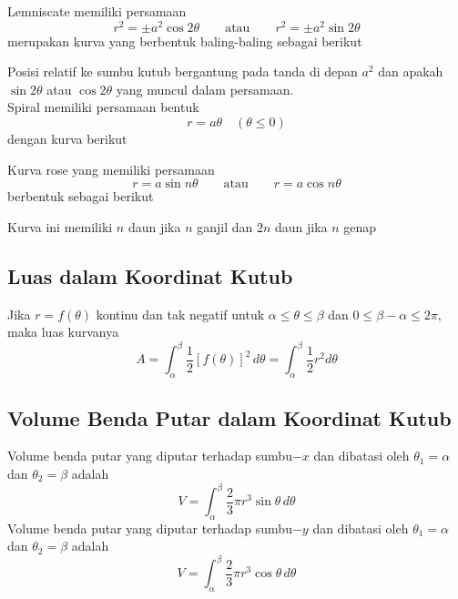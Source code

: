 \documentclass{article}
\begin{document}
Lemniscate memiliki persamaan 
$$ r^2=\pm a^2\cos 2\theta \qquad \text{atau}\qquad r^2=\pm a^2\sin 2\theta $$
merupakan kurva yang berbentuk baling-baling sebagai berikut 
\begin{center}
	\end{center}
Posisi relatif ke sumbu kutub bergantung pada tanda di depan $a^2$ dan apakah $\sin 2\theta$ atau $\cos 2\theta$ yang muncul dalam persamaan.\\
Spiral memiliki persamaan bentuk 
$$ r=a\theta \quad (\theta\leq 0) $$
dengan kurva berikut
\begin{center}
	\end{center} 
Kurva rose yang memiliki persamaan 
$$ r=a\sin n\theta \qquad\text{atau}\qquad r=a\cos n\theta $$
berbentuk sebagai berikut 
\begin{center}
	\end{center}
Kurva ini memiliki $n$ daun jika $n$ ganjil dan $2n$ daun jika $n$ genap
\subsection{Luas dalam Koordinat Kutub}
Jika $r=f(\theta)$ kontinu dan tak negatif untuk $\alpha \leq \theta\leq \beta$ dan $0\leq \beta-\alpha\leq 2\pi$, maka luas kurvanya 
$$ A=\int_\alpha^\beta \dfrac{1}{2}[f(\theta)]^2\, d\theta = \int_\alpha^\beta \dfrac{1}{2} r^2 d\theta $$
\subsection{Volume Benda Putar dalam Koordinat Kutub}
Volume benda putar yang diputar terhadap sumbu$-x$ dan dibatasi oleh $\theta_1=\alpha$ dan $\theta_2=\beta$ adalah 
$$ V=\int_\alpha^\beta \dfrac{2}{3}\pi r^3\sin\theta \, d\theta $$
Volume benda putar yang diputar terhadap sumbu$-y$ dan dibatasi oleh $\theta_1=\alpha$ dan $\theta_2=\beta$ adalah 
$$ V=\int_\alpha^\beta \dfrac{2}{3}\pi r^3\cos\theta \, d\theta $$
\end{document}
